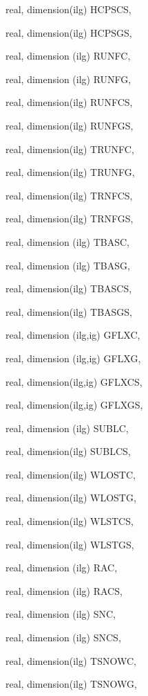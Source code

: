 {\begin{DoxyParamCaption}
\item[{real, dimension(ilg)}]{H\+C\+P\+S\+C\+S, }
\item[{real, dimension(ilg)}]{H\+C\+P\+S\+G\+S, }
\item[{real, dimension (ilg)}]{R\+U\+N\+F\+C, }
\item[{real, dimension (ilg)}]{R\+U\+N\+F\+G, }
\item[{real, dimension(ilg)}]{R\+U\+N\+F\+C\+S, }
\item[{real, dimension(ilg)}]{R\+U\+N\+F\+G\+S, }
\item[{real, dimension(ilg)}]{T\+R\+U\+N\+F\+C, }
\item[{real, dimension(ilg)}]{T\+R\+U\+N\+F\+G, }
\item[{real, dimension(ilg)}]{T\+R\+N\+F\+C\+S, }
\item[{real, dimension(ilg)}]{T\+R\+N\+F\+G\+S, }
\item[{real, dimension (ilg)}]{T\+B\+A\+S\+C, }
\item[{real, dimension (ilg)}]{T\+B\+A\+S\+G, }
\item[{real, dimension(ilg)}]{T\+B\+A\+S\+C\+S, }
\item[{real, dimension(ilg)}]{T\+B\+A\+S\+G\+S, }
\item[{real, dimension (ilg,ig)}]{G\+F\+L\+X\+C, }
\item[{real, dimension (ilg,ig)}]{G\+F\+L\+X\+G, }
\item[{real, dimension(ilg,ig)}]{G\+F\+L\+X\+C\+S, }
\item[{real, dimension(ilg,ig)}]{G\+F\+L\+X\+G\+S, }
\item[{real, dimension (ilg)}]{S\+U\+B\+L\+C, }
\item[{real, dimension(ilg)}]{S\+U\+B\+L\+C\+S, }
\item[{real, dimension(ilg)}]{W\+L\+O\+S\+T\+C, }
\item[{real, dimension(ilg)}]{W\+L\+O\+S\+T\+G, }
\item[{real, dimension(ilg)}]{W\+L\+S\+T\+C\+S, }
\item[{real, dimension(ilg)}]{W\+L\+S\+T\+G\+S, }
\item[{real, dimension   (ilg)}]{R\+A\+C, }
\item[{real, dimension  (ilg)}]{R\+A\+C\+S, }
\item[{real, dimension   (ilg)}]{S\+N\+C, }
\item[{real, dimension  (ilg)}]{S\+N\+C\+S, }
\item[{real, dimension(ilg)}]{T\+S\+N\+O\+W\+C, }
\item[{real, dimension(ilg)}]{T\+S\+N\+O\+W\+G, }

\end{DoxyParamCaption}}
